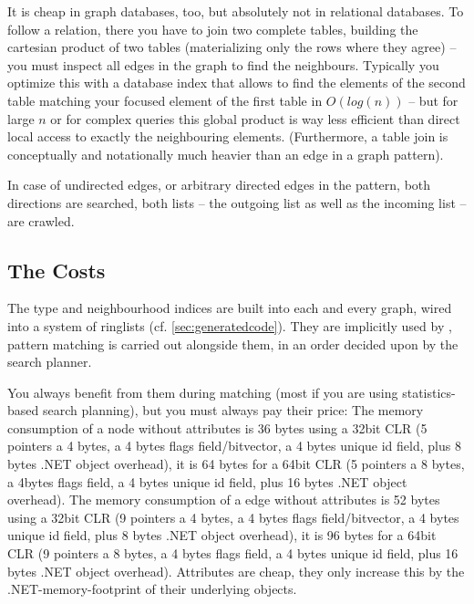It is cheap in graph databases, too, but absolutely not in relational databases.
To follow a relation, there you have to join two complete tables, building the cartesian product of two tables (materializing only the rows where they agree) -- you must inspect all edges in the graph to find the neighbours.
Typically you optimize this with a database index that allows to find the elements of the second table matching your focused element of the first table in $O(log(n))$ -- but for large $n$ or for complex queries this global product is way less efficient than direct local access to exactly the neighbouring elements.
(Furthermore, a table join is conceptually and notationally much heavier than an edge in a graph pattern).

In case of undirected edges, or arbitrary directed edges in the pattern, both directions are searched,
both lists -- the outgoing list as well as the incoming list -- are crawled.

\pagebreak %

\subsection{The Costs}\label{sec:performancememory} 
The type and neighbourhood indices are built into each and every \GrG{} graph, wired into a system of ringlists (cf. \ref{sec:generatedcode}).
They are implicitly used by \GrG{}, pattern matching is carried out alongside them, in an order decided upon by the search planner. 

You always benefit from them during matching (most if you are using statistics-based search planning), but you must always pay their price:
The memory consumption of a \GrG{} node without attributes is 36 bytes using a 32bit CLR (5 pointers a 4 bytes, a 4 bytes flags field/bitvector, a 4 bytes unique id field, plus 8 bytes .NET object overhead), it is 64 bytes for a 64bit CLR (5 pointers a 8 bytes, a 4bytes flags field, a 4 bytes unique id field, plus 16 bytes .NET object overhead).
The memory consumption of a \GrG{} edge without attributes is 52 bytes using a 32bit CLR (9 pointers a 4 bytes, a 4 bytes flags field/bitvector, a 4 bytes unique id field, plus 8 bytes .NET object overhead), it is 96 bytes for a 64bit CLR (9 pointers a 8 bytes, a 4 bytes flags field, a 4 bytes unique id field, plus 16 bytes .NET object overhead).
Attributes are cheap, they only increase this by the .NET-memory-footprint of their underlying objects.

